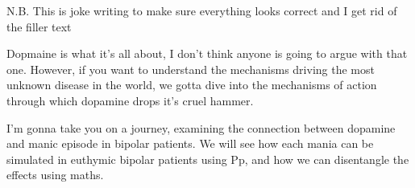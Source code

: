 
N.B. This is joke writing to make sure everything looks correct and I get rid of the filler text

Dopmaine is what it's all about, I don't think anyone is going to argue with that one. However, if you want to understand the mechanisms driving the most unknown disease in the world, we gotta dive into the mechanisms of action through which dopamine drops it's cruel hammer. 

I'm gonna take you on a journey, examining the connection between dopamine and manic episode in bipolar patients. We will see how each mania can be simulated in euthymic bipolar patients using Pp, and how we can disentangle the effects using maths. 